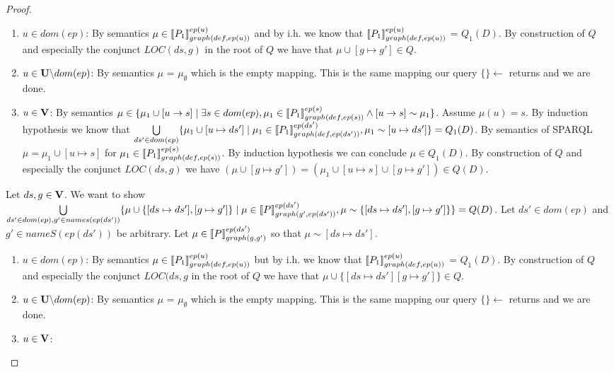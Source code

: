 \begin{proof}
\begin{enumerate}
			\begin{enumerate}
				\item  $u \in dom(ep)$:
					By semantics $\mu \in \llbracket P_1
					\rrbracket^{ep(u)}_{graph(def,ep(u))}$
					and by i.h. we know that $\llbracket P_1 \rrbracket^{ep(u)}_{graph(def,ep(u))}$ =	$Q_1(D)$.
					By construction of $Q$ and especially the conjunct
					$LOC(ds,g)$ in the root of $Q$ we have that $\mu\cup[g \mapsto g'] \in Q$.
				\item $u \in \mathbf{U}\backslash dom(ep)$:
					By semantics $\mu$ = $\mu_\emptyset$ which is the empty
					mapping. This is the same mapping our query
					$\{\} \leftarrow$ returns and we are
					done.
				\item $u \in \mathbf{V}$:
					By semantics $\mu \in \{ \mu_1 \cup [u \rightarrow s ] \mid
						\exists s \in dom(ep), \mu_1 \in \llbracket P_1
						\rrbracket^{ep(s)}_{graph(def,ep(s))} \land
					[u \rightarrow s] \sim \mu_1 \}$. Assume $\mu(u) = s$.
					By induction hypothesis we know that 
					$\bigcup\limits_{ds' \in dom(ep)} \{ \mu_1 \cup [u
						\mapsto ds'] \mid \mu_1 \in
						\llbracket P_1\rrbracket^{ep(ds')}_{graph(def,ep(ds'))},
					\mu_1 \sim [u\mapsto ds'] \} = Q_1(D) $.
					By semantics of SPARQL $\mu = \mu_1 \cup
					[u \mapsto s]$ for  $\mu_1 \in \llbracket
					P_1\rrbracket^{ep(s)}_{graph(def,ep(s))}$. 
					By induction hypothesis we can conclude
					$\mu \in Q_1(D)$.
					By construction of $Q$ and especially the conjunct
					$LOC(ds,g)$ we have $(\mu \cup [g \mapsto g']) = (\mu_1 \cup [u \mapsto s] 
					\cup [g	\mapsto g']) \in Q(D)$. 
			\end{enumerate}

			\bigskip\noindent
			Let $ds,g \in \mathbf{V}$.
			We want to show  	
			$\bigcup\limits_{ds' \in dom(ep), g' \in names(ep(ds'))} \{ \mu \cup
				\{[ds \mapsto ds'],[g \mapsto g']\} \mid \mu \in
				\llbracket P\rrbracket^{ep(ds')}_{graph(g',ep(ds'))}, 
				\mu \sim
			\{[ds \mapsto ds'], [g \mapsto g']\}\} = Q(D)$.
			Let $ds' \in dom(ep)$ and $g' \in nameS(ep(ds'))$ be arbitrary.
			Let $\mu \in \llbracket P \rrbracket^{ep(ds')}_{graph(g,g')}$ so that $\mu \sim
			[ds\mapsto ds']$.
			\begin{enumerate}
				\item  $u \in dom(ep)$:
					By semantics $\mu \in \llbracket P_1
					\rrbracket^{ep(u)}_{graph(def,ep(u))}$
					but by i.h. we know that 
					$\llbracket P_1 \rrbracket^{ep(u)}_{graph(def,ep(u))}$ =
					$Q_1(D)$.
					By construction of $Q$ and especially the conjunct
					$LOC(ds,g$ in the root of $Q$ we
					have that $\mu\cup \{[ds \mapsto ds'][g \mapsto g']\} \in Q$.
				\item $u \in \mathbf{U}\backslash dom(ep)$:
					By semantics $\mu$ = $\mu_\emptyset$ which is the empty
					mapping. This is the same mapping our query
					$\{\} \leftarrow$ returns and we are
					done.
				\item $u \in \mathbf{V}$:
					

\end{enumerate}
\end{enumerate}
\end{proof}
